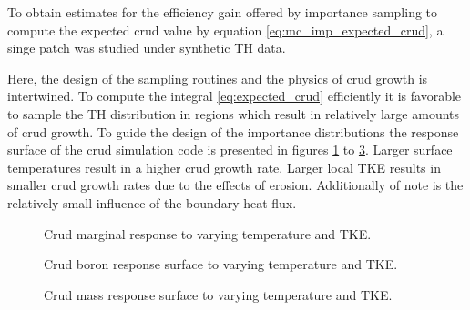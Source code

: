 To obtain estimates for the efficiency gain offered by importance sampling to compute the expected crud value by equation \ref{eq:mc_imp_expected_crud}, a singe patch was studied under synthetic TH data.

Here, the design of the sampling routines and the physics of crud growth is intertwined.  To compute the integral \ref{eq:expected_crud} efficiently it is favorable to sample the TH distribution in regions which result in relatively large amounts of crud growth.  To guide the design of the importance distributions the response surface of the crud simulation code is presented in figures \ref{fig:crud_sensi1} to \ref{fig:crud_sensi3}.  Larger surface temperatures result in a higher crud growth rate.  Larger local TKE results in smaller crud growth rates due to the effects of erosion.  Additionally of note is the relatively small influence of the boundary heat flux.  

\begin{figure}[H]%
    \centering
    \qquad
    \caption[]{Crud marginal response to varying temperature and TKE.}%
    \label{fig:crud_sensi1}%
\end{figure}

\begin{figure}[H]%
    \centering
    \qquad
    \caption[]{Crud boron response surface to varying temperature and TKE.}%
    \label{fig:crud_sensi2}%
\end{figure}

\begin{figure}[H]%
    \centering
    \qquad
    \caption[]{Crud mass response surface to varying temperature and TKE.}%
    \label{fig:crud_sensi3}%
\end{figure}


